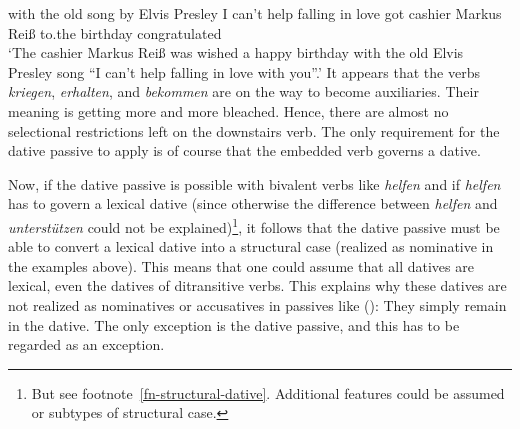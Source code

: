      with the old song   by  Elvis Presley \hphantom{"`}I can't help falling in love got cashier Markus Reiß to.the birthday congratulated\\
\glt `The cashier Markus Reiß was wished a happy birthday with the old Elvis Presley song ``I can't help falling in love with you''.'
\zl
It appears that the verbs \emph{kriegen}, \emph{erhalten}, and \emph{bekommen} are on the way to become
auxiliaries. Their meaning is getting more and more bleached. Hence, there are almost no selectional
restrictions left on the downstairs verb. The only requirement for the dative passive to apply is of
course that the embedded verb governs a dative.

Now, if the dative passive is possible with bivalent verbs like \emph{helfen} and if \emph{helfen}
has to govern a lexical dative (since otherwise the difference between \emph{helfen} and
\emph{unterstützen} could not be explained)\footnote{%
  But see footnote~\ref{fn-structural-dative}. Additional features could be assumed or subtypes of
  structural case.}, 
it follows that the dative passive must be able to
convert a lexical dative into a structural case (realized as nominative in the examples above). This
means that one could assume that all datives are lexical, even the datives of ditransitive
verbs. This explains why these datives are not realized as nominatives or accusatives in passives
like ():
\eal
{}
\zl
They simply remain in the dative. The only exception is the dative passive, and this has to be regarded as an exception.





